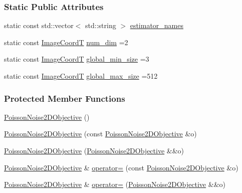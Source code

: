 \subsubsection*{Static Public Attributes}
\begin{DoxyCompactItemize}
\item 
static const std\+::vector$<$ std\+::string $>$ \hyperlink{classmappel_1_1PoissonNoise2DObjective_ac661699516dcee8b4e8a440e9b8b62d1}{estimator\+\_\+names}
\item 
static const \hyperlink{classmappel_1_1ImageFormat2DBase_a45e9234d63c357f34ca56c72c12b9e9c}{Image\+CoordT} \hyperlink{classmappel_1_1ImageFormat2DBase_a9c29fcaf30faffc77b41ba556ebb0127}{num\+\_\+dim} =2
\item 
static const \hyperlink{classmappel_1_1ImageFormat2DBase_a45e9234d63c357f34ca56c72c12b9e9c}{Image\+CoordT} \hyperlink{classmappel_1_1ImageFormat2DBase_a1149e8545d3cfaa40c2f3bc02e3223b2}{global\+\_\+min\+\_\+size} =3
\item 
static const \hyperlink{classmappel_1_1ImageFormat2DBase_a45e9234d63c357f34ca56c72c12b9e9c}{Image\+CoordT} \hyperlink{classmappel_1_1ImageFormat2DBase_a11c9bb87930f597dff17e9923b73bf5e}{global\+\_\+max\+\_\+size} =512
\end{DoxyCompactItemize}
\subsubsection*{Protected Member Functions}
\begin{DoxyCompactItemize}
\item 
\hyperlink{classmappel_1_1PoissonNoise2DObjective_a733143e5fc3ce27a56dd82be4c9f856b}{Poisson\+Noise2\+D\+Objective} ()
\item 
\hyperlink{classmappel_1_1PoissonNoise2DObjective_ad14befab569fbd9b46f10c4821195df0}{Poisson\+Noise2\+D\+Objective} (const \hyperlink{classmappel_1_1PoissonNoise2DObjective}{Poisson\+Noise2\+D\+Objective} \&o)
\item 
\hyperlink{classmappel_1_1PoissonNoise2DObjective_a02cf9e3aac9007f74b196db155caea56}{Poisson\+Noise2\+D\+Objective} (\hyperlink{classmappel_1_1PoissonNoise2DObjective}{Poisson\+Noise2\+D\+Objective} \&\&o)
\item 
\hyperlink{classmappel_1_1PoissonNoise2DObjective}{Poisson\+Noise2\+D\+Objective} \& \hyperlink{classmappel_1_1PoissonNoise2DObjective_abdfcdfc3fb1a1da2a0b7c3898532175e}{operator=} (const \hyperlink{classmappel_1_1PoissonNoise2DObjective}{Poisson\+Noise2\+D\+Objective} \&o)
\item 
\hyperlink{classmappel_1_1PoissonNoise2DObjective}{Poisson\+Noise2\+D\+Objective} \& \hyperlink{classmappel_1_1PoissonNoise2DObjective_a8b63699670414e1acbf14262d99c779d}{operator=} (\hyperlink{classmappel_1_1PoissonNoise2DObjective}{Poisson\+Noise2\+D\+Objective} \&\&o)
\end{DoxyCompactItemize}

